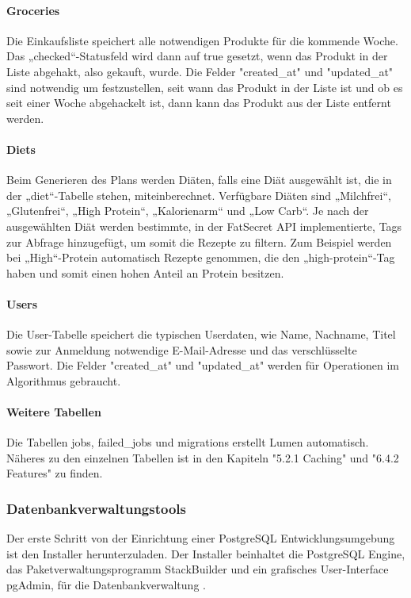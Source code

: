\paragraph{Groceries}
Die Einkaufsliste speichert alle notwendigen Produkte für die kommende Woche. Das „checked“-Statusfeld wird dann auf true gesetzt, wenn das Produkt in der Liste abgehakt, also gekauft, wurde. Die Felder "created\_at" und "updated\_at" sind notwendig um festzustellen, seit wann das Produkt in der Liste ist und ob es seit einer Woche abgehackelt ist, dann kann das Produkt aus der Liste entfernt werden.

\paragraph{Diets}
Beim Generieren des Plans werden Diäten, falls eine Diät ausgewählt ist, die in der „diet“-Tabelle stehen, miteinberechnet. Verfügbare Diäten sind „Milchfrei“, „Glutenfrei“, „High Protein“, „Kalorienarm“ und „Low Carb“. Je nach der ausgewählten Diät werden bestimmte, in der FatSecret API implementierte, Tags zur Abfrage hinzugefügt, um somit die Rezepte zu filtern. Zum Beispiel werden bei „High“-Protein automatisch Rezepte genommen, die den „high-protein“-Tag haben und somit einen hohen Anteil an Protein besitzen.

\paragraph{Users}
Die User-Tabelle speichert die typischen Userdaten, wie Name, Nachname, Titel sowie zur Anmeldung notwendige E-Mail-Adresse und das verschlüsselte Passwort. Die Felder "created\_at" und "updated\_at" werden für Operationen im Algorithmus gebraucht.

\paragraph{Weitere Tabellen}
Die Tabellen jobs, failed\_jobs und migrations erstellt Lumen automatisch. Näheres zu den einzelnen Tabellen ist in den Kapiteln "5.2.1 Caching" und "6.4.2 Features" zu finden.


\subsubsection{Datenbankverwaltungstools}
Der erste Schritt von der Einrichtung einer PostgreSQL Entwicklungsumgebung ist den Installer herunterzuladen. Der Installer beinhaltet die PostgreSQL Engine, das Paketverwaltungsprogramm StackBuilder und ein grafisches User-Interface pgAdmin, für die Datenbankverwaltung . 

